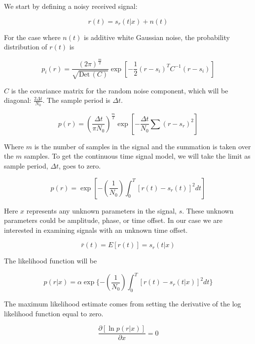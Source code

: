 \documentclass[11pt]{article}
\def\Det{{\textrm{Det}}\,}
\begin{document}
We start by defining a noisy received signal:


\begin{equation}
r(t) = s_r(t|x) + n(t)
\end{equation}

For the case where $n(t)$ is additive white Gaussian noise, the probability distribution of $r(t)$ is

\begin{equation}
p_i(r)
=
\frac{(2\pi)^\frac{m}{2}}{\sqrt{\Det(C)}}
\exp \left[ -\frac{1}{2} (r-s_i)^T C^{-1} (r-s_i) \right]
\end{equation}

$C$ is the covariance matrix for the random noise component, which will be diagonal: $\frac{2\Delta t}{N_0}$.  The sample period is $\Delta t$.

\begin{equation}
p(r)
=
\left( \frac{\Delta t}{\pi N_0} \right)^\frac{m}{2}
\exp \left[ -\frac{\Delta t}{N_0} \sum (r - s_r)^2 \right]
\end{equation}

Where $m$ is the number of samples in the signal and the summation is taken over the $m$ samples. 
To get the continuous time signal model, we will take the limit as sample period, $\Delta t$, goes to zero.

\begin{equation}
p(r) = \exp \left[ -\left(\frac{1}{N_0}\right) \int^T_0 \left[ r(t) - s_r(t) \right]^2 dt \right]
\end{equation}

Here $x$ represents any unknown parameters in the signal, $s$. These unknown parameters could be amplitude, phase, or time offset. In our case we are interested in examining signals with an unknown time offset.

\begin{equation}
\bar{r}(t) = E[r(t)] = s_r(t|x)
\end{equation}

The likelihood function will be

\begin{equation}
p(r|x) 
=
\alpha \exp \{ - \left( \frac{1}{N_0} \right) \int^T_0 \left[ r(t) - s_r(t|x) \right]^2 dt \}
\end{equation}


The maximum likelihood estimate comes from setting the derivative of the log likelihood function equal to zero.

\begin{equation}
\frac{\partial \left[ \ln p(r|x) \right]}{\partial x}
= 0
\end{equation}
\end{document}
